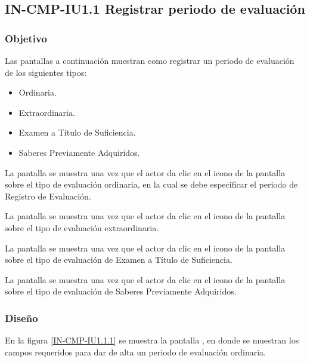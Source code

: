 \subsection{IN-CMP-IU1.1 Registrar periodo de evaluación}

\subsubsection{Objetivo}
	
	Las pantallas a continuación muestran como registrar un periodo de evaluación de los siguientes tipos:
	\begin{itemize}
		\item Ordinaria.
		\item Extraordinaria.
		\item Examen a Título de Suficiencia.
		\item Saberes Previamente Adquiridos.
	\end{itemize}

	La pantalla  se muestra una vez que el actor da clic en el icono {\IUAdd} de la pantalla  sobre el tipo de evaluación ordinaria, en la cual se debe especificar el periodo de Registro de Evaluación.
	
	La pantalla  se muestra una vez que el actor da clic en el icono {\IUAdd} de la pantalla  sobre el tipo de evaluación extraordinaria.
	
	La pantalla  se muestra una vez que el actor da clic en el icono {\IUAdd} de la pantalla  sobre el tipo de evaluación de Examen a Título de Suficiencia.

	La pantalla  se muestra una vez que el actor da clic en el icono {\IUAdd} de la pantalla  sobre el tipo de evaluación de Saberes Previamente Adquiridos.

\subsubsection{Diseño}

    En la figura \ref{IN-CMP-IU1.1.1} se muestra la pantalla , en donde se muestran los campos requeridos para dar de alta un periodo de evaluación ordinaria.\\
    
    
